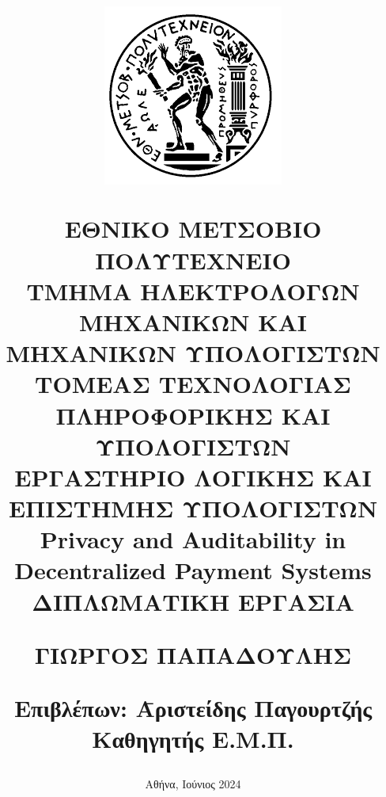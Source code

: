 \title{
\vspace{-6ex}
\begin{center}
\includegraphics[scale=0.5]{images/ntua.png}
\end{center}
\slg
\Large{Ε}\large{ΘΝΙΚΟ}
\Large{Μ}\large{ΕΤΣΟΒΙΟ}
\Large{Π}\large{ΟΛΥΤΕΧΝΕΙΟ} \\
\normalsize{Τ}\small{ΜΗΜΑ}
\normalsize{Η}\small{ΛΕΚΤΡΟΛΟΓΩΝ}
\normalsize{Μ}\small{ΗΧΑΝΙΚΩΝ}
\normalsize{Κ}\small{ΑΙ}
\normalsize{Μ}\small{ΗΧΑΝΙΚΩΝ}
\normalsize{Υ}\small{ΠΟΛΟΓΙΣΤΩΝ} \\
\vspace{2ex}
\normalsize{Τ}\small{ΟΜΕΑΣ}
\normalsize{Τ}\small{ΕΧΝΟΛΟΓΙΑΣ}
\normalsize{Π}\small{ΛΗΡΟΦΟΡΙΚΗΣ}
\normalsize{Κ}\small{ΑΙ}
\normalsize{Υ}\small{ΠΟΛΟΓΙΣΤΩΝ} \\
\normalsize{Ε}\small{ΡΓΑΣΤΗΡΙΟ} 
\normalsize{Λ}\small{ΟΓΙΚΗΣ}
\normalsize{Κ}\small{ΑΙ}
\normalsize{Ε}\small{ΠΙΣΤΗΜΗΣ}
\normalsize{Υ}\small{ΠΟΛΟΓΙΣΤΩΝ} \\
\vspace{8ex}
\sle
\large \textbf{Privacy and Auditability in Decentralized Payment Systems} \\
\vspace{10ex}
\slg
\large
ΔΙΠΛΩΜΑΤΙΚΗ ΕΡΓΑΣΙΑ \\
\vspace{2ex}
\parbox[c]{0.4\textwidth} { \center\textbf{
ΓΙΩΡΓΟΣ ΠΑΠΑΔΟΥΛΗΣ}}
\vspace{10ex}
\flushleft
\begin{tabbing}
	\textbf{Επιβλέπων}: \= Αριστείδης Παγουρτζής \\
			    \> Καθηγητής Ε.Μ.Π.
\end{tabbing}
}
\date{
\normalsize
Αθήνα, Ιούνιος 2024}

\maketitle

